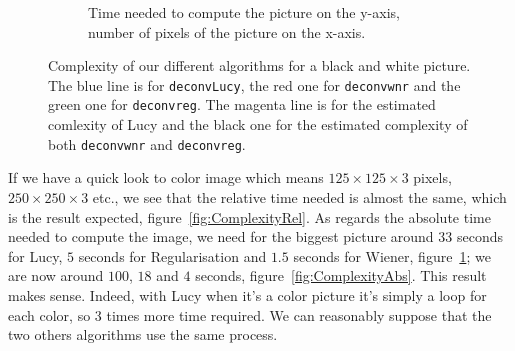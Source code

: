 \documentclass{article}
\begin{document}
\begin{figure}[h!]
\begin{subfigure}{0.4\textwidth}
\caption{Time  needed to compute the picture on the y-axis, number of pixels of the picture on the x-axis.}
\label{fig:ComplexityAbsbw}
\end{subfigure}
\caption{Complexity of our different algorithms for a black and white picture. The blue line is for \texttt{deconvLucy}, the red one for \texttt{deconvwnr} and the green one for \texttt{deconvreg}. The magenta line is for the estimated comlexity of Lucy and the black one for the estimated complexity of both \texttt{deconvwnr} and \texttt{deconvreg}.}
\label{fig:Complexity}
\end{figure}

If we have a quick look to color image which means $125 \times 125 \times 3$ pixels, $250 \times 250 \times 3$ etc., we see that the relative time needed is almost the same, which is the result expected, figure~\ref{fig:ComplexityRel}. As regards the absolute time needed to compute the image, we need for the biggest picture around $33$ seconds for Lucy, $5$ seconds for Regularisation and $1.5$ seconds for Wiener, figure~\ref{fig:ComplexityAbsbw}; we are now around $100$, $18$ and $4$ seconds, figure~\ref{fig:ComplexityAbs}. This result makes sense. Indeed, with Lucy when it's a color picture it's simply a loop for each color, so 3 times more time required. We can reasonably suppose that the two others algorithms use the same process.
\end{document}
